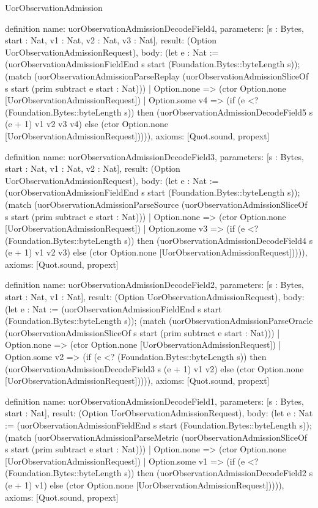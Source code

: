 \begin{lexlean}{UorObservationAdmission}
\begin{semanticmodule}
definition{
  name: uorObservationAdmissionDecodeField4,
  parameters: [s : Bytes, start : Nat, v1 : Nat, v2 : Nat, v3 : Nat],
  result: (Option UorObservationAdmissionRequest),
  body: (let e : Nat := (uorObservationAdmissionFieldEnd s start (Foundation.Bytes::byteLength s)); (match (uorObservationAdmissionParseReplay (uorObservationAdmissionSliceOf s start (prim subtract e start : Nat)))
    | Option.none => (ctor Option.none [UorObservationAdmissionRequest])
    | Option.some v4 => (if (e <? (Foundation.Bytes::byteLength s)) then (uorObservationAdmissionDecodeField5 s (e + 1) v1 v2 v3 v4) else (ctor Option.none [UorObservationAdmissionRequest])))),
  axioms: [Quot.sound, propext]
}

definition{
  name: uorObservationAdmissionDecodeField3,
  parameters: [s : Bytes, start : Nat, v1 : Nat, v2 : Nat],
  result: (Option UorObservationAdmissionRequest),
  body: (let e : Nat := (uorObservationAdmissionFieldEnd s start (Foundation.Bytes::byteLength s)); (match (uorObservationAdmissionParseSource (uorObservationAdmissionSliceOf s start (prim subtract e start : Nat)))
    | Option.none => (ctor Option.none [UorObservationAdmissionRequest])
    | Option.some v3 => (if (e <? (Foundation.Bytes::byteLength s)) then (uorObservationAdmissionDecodeField4 s (e + 1) v1 v2 v3) else (ctor Option.none [UorObservationAdmissionRequest])))),
  axioms: [Quot.sound, propext]
}

definition{
  name: uorObservationAdmissionDecodeField2,
  parameters: [s : Bytes, start : Nat, v1 : Nat],
  result: (Option UorObservationAdmissionRequest),
  body: (let e : Nat := (uorObservationAdmissionFieldEnd s start (Foundation.Bytes::byteLength s)); (match (uorObservationAdmissionParseOracle (uorObservationAdmissionSliceOf s start (prim subtract e start : Nat)))
    | Option.none => (ctor Option.none [UorObservationAdmissionRequest])
    | Option.some v2 => (if (e <? (Foundation.Bytes::byteLength s)) then (uorObservationAdmissionDecodeField3 s (e + 1) v1 v2) else (ctor Option.none [UorObservationAdmissionRequest])))),
  axioms: [Quot.sound, propext]
}

definition{
  name: uorObservationAdmissionDecodeField1,
  parameters: [s : Bytes, start : Nat],
  result: (Option UorObservationAdmissionRequest),
  body: (let e : Nat := (uorObservationAdmissionFieldEnd s start (Foundation.Bytes::byteLength s)); (match (uorObservationAdmissionParseMetric (uorObservationAdmissionSliceOf s start (prim subtract e start : Nat)))
    | Option.none => (ctor Option.none [UorObservationAdmissionRequest])
    | Option.some v1 => (if (e <? (Foundation.Bytes::byteLength s)) then (uorObservationAdmissionDecodeField2 s (e + 1) v1) else (ctor Option.none [UorObservationAdmissionRequest])))),
  axioms: [Quot.sound, propext]
}


\end{semanticmodule}
\end{lexlean}
